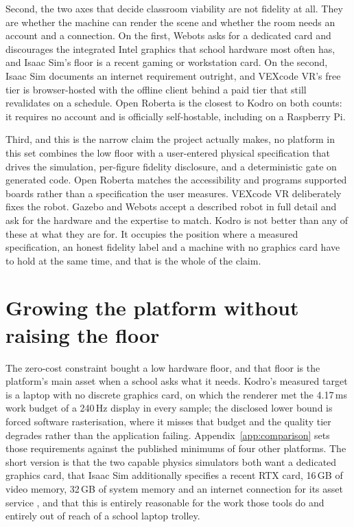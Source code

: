 \documentclass[11pt,a4paper]{report}
\begin{document}
Second, the two axes that decide classroom viability are not fidelity at all. They are whether the machine can render the scene and whether the room needs an account and a connection. On the first, Webots asks for a dedicated card and discourages the integrated Intel graphics that school hardware most often has, and Isaac Sim's floor is a recent gaming or workstation card. On the second, Isaac Sim documents an internet requirement outright, and VEXcode VR's free tier is browser-hosted with the offline client behind a paid tier that still revalidates on a schedule. Open Roberta is the closest to Kodro on both counts: it requires no account and is officially self-hostable, including on a Raspberry Pi.

Third, and this is the narrow claim the project actually makes, no platform in this set combines the low floor with a user-entered physical specification that drives the simulation, per-figure fidelity disclosure, and a deterministic gate on generated code. Open Roberta matches the accessibility and programs supported boards rather than a specification the user measures. VEXcode VR deliberately fixes the robot. Gazebo and Webots accept a described robot in full detail and ask for the hardware and the expertise to match. Kodro is not better than any of these at what they are for. It occupies the position where a measured specification, an honest fidelity label and a machine with no graphics card have to hold at the same time, and that is the whole of the claim.

\section{Growing the platform without raising the floor}
\label{app:scaling}
The zero-cost constraint bought a low hardware floor, and that floor is the platform's main asset when a school asks what it needs. Kodro's measured target is a laptop with no discrete graphics card, on which the renderer met the 4.17\,ms work budget of a 240\,Hz display in every sample; the disclosed lower bound is forced software rasterisation, where it misses that budget and the quality tier degrades rather than the application failing. Appendix~\ref{app:comparison} sets those requirements against the published minimums of four other platforms. The short version is that the two capable physics simulators both want a dedicated graphics card, that Isaac Sim additionally specifies a recent RTX card, 16\,GB of video memory, 32\,GB of system memory and an internet connection for its asset service \citep{isaacsim2026}, and that this is entirely reasonable for the work those tools do and entirely out of reach of a school laptop trolley.
\end{document}

